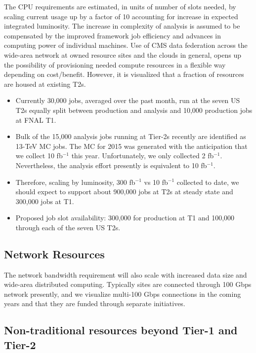 The CPU requirements are estimated, in units of number of slots needed, by scaling current 
usage up by a factor of 10 accounting for increase in expected integrated luminosity.  The 
increase in complexity of analysis is assumed to be compensated by the improved 
framework job efficiency and advances in computing power of individual machines.
Use of CMS data federation across the wide-area network at owned resource sites
and the clouds in general, opens up the possibility of provisioning needed compute
resources in a flexible way depending on cost/benefit.  However, it is visualized
that a fraction of resources are housed at existing T2s.

\begin{itemize}
\item Currently 30,000 jobs, averaged over the past month, run at the seven 
US T2s equally split between production and analysis and 10,000 production
jobs at FNAL T1.
\item Bulk of the 15,000 analysis jobs running at Tier-2s recently are 
identified as 13-TeV MC jobs.  The MC for 2015 was generated with the
anticipation that we collect 10 fb$^{-1}$ this year.  Unfortunately,
we only collected 2 fb$^{-1}$.  Nevertheless, the analysis effort 
presently is equivalent to 10 fb$^{-1}$.
\item Therefore, scaling by luminosity, 300 fb$^{-1}$ vs 10 fb$^{-1}$ collected 
to date, we should expect to support about 900,000 jobs at T2s at steady state 
and 300,000 jobs at T1.
\item Proposed job slot availability: 300,000 for production at T1 and 100,000 through each of the seven US T2s.
\end{itemize}

\subsection{Network Resources}

The network bandwidth requirement will also scale with increased data size 
and wide-area distributed computing.  Typically sites are connected through
100 Gbps network presently, and we visualize multi-100 Gbps connections
in the coming years and that they are funded through separate initiatives.

\subsection{Non-traditional resources beyond Tier-1 and Tier-2}

